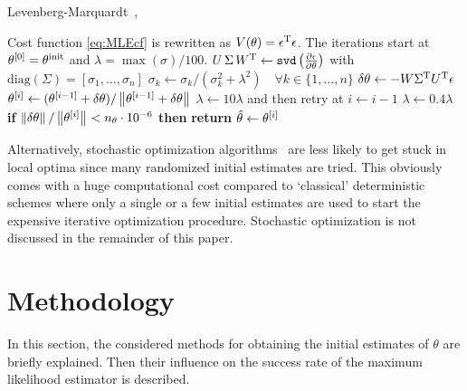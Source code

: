 \begin{algorithm}
\caption{Levenberg-Marquardt~\citep{Marquardt1963}, \citep[Sec. 9.L.4]{Pintelon2012}}\label{LMalgo}
\begin{algorithmic}[1]
  \Statex Cost function \eqref{eq:MLEcf} is rewritten as $V(\theta) = \epsilon^{\mathrm{T}} \epsilon$. 
  \Statex The iterations start at ${\theta}^{[0]} = \theta^{\mathrm{init}}$ and $\lambda = \max(\sigma)/100$.
      \State $U \, \Sigma \, W^{\mathrm{T}} \gets \mathtt{svd}\left( \frac{\partial \epsilon}{\partial \theta}\right)$ with $\mathrm{diag}(\Sigma) = [\sigma_1, \ldots, \sigma_n]$
      \State $\sigma_k \gets \sigma_k / (\sigma_k^2 + \lambda^2) \quad \forall k \in \{1, \ldots, n\}$
      \State $\delta\theta \gets - W  \Sigma^{\mathrm{T}}  U^{\mathrm{T}} \epsilon$
      \State ${\theta}^{[i]} \gets ({\theta}^{[i-1]} + \delta\theta) / \left\| {\theta}^{[i-1]} + \delta\theta \right\|_{} $
          \State $\lambda \gets 10 \lambda$ and then retry at $i \gets i - 1$
      \Else
          \State $\lambda \gets 0.4 \lambda$
      \EndIf
      \State \textbf{if} $\left\| \delta\theta \right\|_{}/\left\| {\theta}^{[i]} \right\|_{} < n_{\theta}  \cdot 10^{-6} $ \textbf{then} \textbf{return} $\hat{\theta} \gets {\theta}^{[i]}$
   \EndFor
\end{algorithmic}
\end{algorithm}

\begin{remark}
Alternatively, stochastic optimization algorithms~\citep{Spall2012,Press2007} are less likely to get stuck in local optima since many randomized initial estimates are tried.
This obviously comes with a huge computational cost compared to `classical' deterministic schemes where only a single or a few initial estimates are used to start the expensive iterative optimization procedure.
Stochastic optimization is not discussed in the remainder of this paper.
\end{remark}

\section{Methodology}\label{se:MethodEg}
In this section, the considered methods for obtaining the initial estimates of $\theta$ are briefly explained. Then their influence on the success rate of the maximum likelihood estimator is described.


